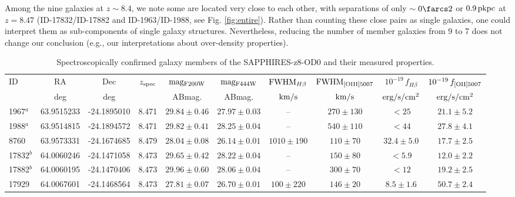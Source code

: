\documentclass[twocolumn]{aastex631}
\begin{document}
Among the nine galaxies at $z\sim8.4$, we note some are located very close to each other, with separations of only $\sim 0\farcs2$ or $0.9\,{\rm pkpc}$ at $z=8.47$ (ID-17832/ID-17882 and ID-1963/ID-1988, see Fig. \ref{fig:entire}).
Rather than counting these close pairs as single galaxies, one could interpret them as sub-components of single galaxy structures.
Nevertheless, reducing the number of member galaxies from 9 to 7 does not change our conclusion (e.g., our interpretations about over-density properties).

\begin{table}[t]
    \centering
    \renewcommand{\tabcolsep}{0.12cm}
    \caption{Spectroscopically confirmed galaxy members of the SAPPHIRES-z8-OD0 and their measured properties.}
    \begin{tabular}{lccccccccc}
    \hline
       ID  &  RA & Dec &  $z_{\rm spec}$ & ${\rm mag_{F200W}}$ &  ${\rm mag_{F444W}}$ & ${{\rm FWHM}_{H\beta}}$ & ${{\rm FWHM}_{\rm [OIII]5007}}$ & ${10^{-19} \,f_{H\beta}}$ & ${10^{-19}\,f_{\rm [OII]5007}}$\\
       & deg & deg & & ABmag. & ABmag. & ${\rm km/s}$ & ${\rm km/s}$ & ${\rm erg/s/cm^2}$ & ${\rm erg/s/cm^2}$ \\
    \hline
        1967$^{a}$ & 63.9515233 & -24.1895010 & 8.471 & $29.84\pm0.46$& $27.97\pm0.03 $  & -- & $270 \pm 130$ & $<25$ & $21.1\pm5.2$ \\
    1988$^{a}$ & 63.9514815 & -24.1894572 & 8.471 & $29.82\pm0.41$& $28.25\pm0.04 $  & 
    -- & $540\pm110$ & $<44$ & $27.8\pm4.1$ \\
    8760 & 63.9573331 & -24.1674685 & 8.479 & $28.04\pm0.08$& $26.14\pm0.01 $  & $1010 \pm 190$ & $110\pm70$ & $32.4\pm5.0$ & $17.7\pm2.5$ \\
    17832$^{b}$ & 64.0060246 & -24.1471058 & 8.473 & $29.65\pm0.42$& $28.22\pm0.04 $  & -- & $150\pm80$ & $<5.9$ & $12.0\pm2.2$ \\
    17882$^{b}$ & 64.0060195 & -24.1470406 & 8.473 & $29.96\pm0.60$& $28.06\pm0.04 $ & -- & $300\pm70$ & $<12$ & $19.2\pm2.5$ \\
    17929 & 64.0067601 & -24.1468564 & 8.473 & $27.81\pm0.07$& $26.70\pm0.01 $  & $100\pm220$ & $146\pm20$ & $8.5\pm1.6$ & $50.7\pm2.4$ \\

\end{tabular}
\end{table}
\end{document}
